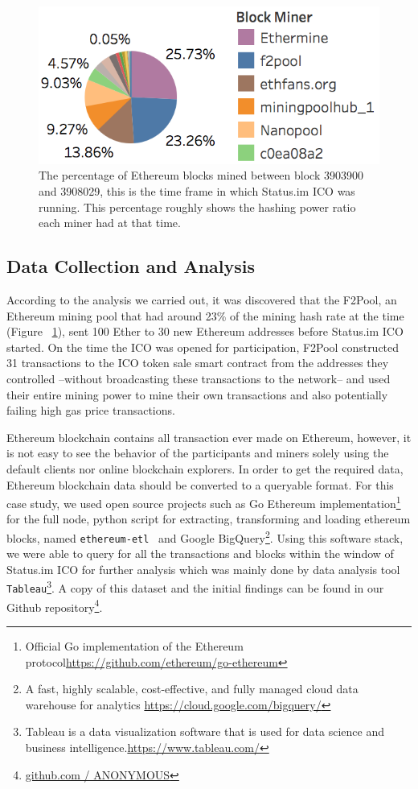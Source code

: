 \begin{figure}[h]
\centering
\includegraphics[width=0.5\linewidth]{figures/Mining_pool_ratio.png}
\caption{The percentage of Ethereum blocks mined between block 3903900 and 3908029, this is the time frame in which Status.im ICO was running. This percentage roughly shows the hashing power ratio each miner had at that time. \label{fig:mining_pool_ratio}} %
\end{figure}

\subsection{Data Collection and Analysis}
According to the analysis we carried out, it was discovered that the F2Pool, an Ethereum mining pool that had around 23\% of the mining hash rate at the time (Figure ~\ref{fig:mining_pool_ratio}), sent 100 Ether to 30 new Ethereum addresses before Status.im ICO started. On the time the ICO was opened for participation, F2Pool constructed 31 transactions to the ICO token sale smart contract from the addresses they controlled --without broadcasting these transactions to the network-- and used their entire mining power to mine their own transactions and also potentially failing high gas price transactions.

Ethereum blockchain contains all transaction ever made on Ethereum, however, it is not easy to see the behavior of the participants and miners solely using the default clients nor online blockchain explorers. In order to get the required data, Ethereum blockchain data should be converted to a queryable format. For this case study, we used open source projects such as Go Ethereum implementation\footnote{Official Go implementation of the Ethereum protocol\url{https://github.com/ethereum/go-ethereum}} for the full node, python script for extracting, transforming and loading ethereum blocks, named \texttt{ethereum-etl}~\cite{ethereumetl} and Google BigQuery\footnote{A fast, highly scalable, cost-effective, and fully managed cloud data warehouse for analytics \url{https://cloud.google.com/bigquery/}}. Using this software stack, we were able to query for all the transactions and blocks within the window of Status.im ICO for further analysis which was mainly done by data analysis tool \texttt{Tableau}\footnote{Tableau is a data visualization software that is used for data science and business intelligence.\url{https://www.tableau.com/}}. A copy of this dataset and the initial findings can be found in our Github repository\footnote{\url{github.com / ANONYMOUS}}. 


